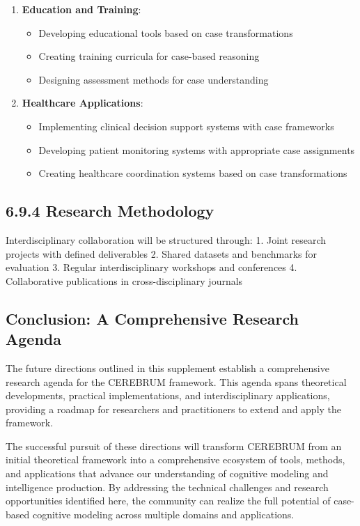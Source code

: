\documentclass[
  11pt,
  letterpaper,
]{article}
\providecommand{\tightlist}{%
  \setlength{\itemsep}{0pt}\setlength{\parskip}{0pt}}
\begin{document}
\begin{enumerate}
\def\labelenumi{\arabic{enumi}.}
\tightlist
\item
  \textbf{Education and Training}:

  \begin{itemize}
  \tightlist
  \item
    Developing educational tools based on case transformations
  \item
    Creating training curricula for case-based reasoning
  \item
    Designing assessment methods for case understanding
  \end{itemize}
\item
  \textbf{Healthcare Applications}:

  \begin{itemize}
  \tightlist
  \item
    Implementing clinical decision support systems with case frameworks
  \item
    Developing patient monitoring systems with appropriate case
    assignments
  \item
    Creating healthcare coordination systems based on case
    transformations
  \end{itemize}
\end{enumerate}

\hypertarget{research-methodology-1}{%
\subsection{6.9.4 Research Methodology}\label{research-methodology-1}}

Interdisciplinary collaboration will be structured through: 1. Joint
research projects with defined deliverables 2. Shared datasets and
benchmarks for evaluation 3. Regular interdisciplinary workshops and
conferences 4. Collaborative publications in cross-disciplinary journals

\hypertarget{conclusion-a-comprehensive-research-agenda}{%
\subsection{Conclusion: A Comprehensive Research
Agenda}\label{conclusion-a-comprehensive-research-agenda}}

The future directions outlined in this supplement establish a
comprehensive research agenda for the CEREBRUM framework. This agenda
spans theoretical developments, practical implementations, and
interdisciplinary applications, providing a roadmap for researchers and
practitioners to extend and apply the framework.

The successful pursuit of these directions will transform CEREBRUM from
an initial theoretical framework into a comprehensive ecosystem of
tools, methods, and applications that advance our understanding of
cognitive modeling and intelligence production. By addressing the
technical challenges and research opportunities identified here, the
community can realize the full potential of case-based cognitive
modeling across multiple domains and applications.
\end{document}
